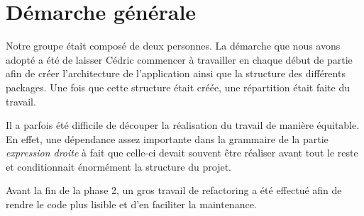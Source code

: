 \section{Démarche générale}


Notre groupe était composé de deux personnes. La démarche que nous avons adopté a été de laisser Cédric commencer à travailler en chaque début de partie afin de créer l'architecture de l'application ainsi que la structure des différents packages. Une fois que cette structure était créée, une répartition était faite du travail.
 
 
 Il a parfois été difficile de découper la réalisation du travail de manière équitable. En effet, une dépendance assez importante dans la grammaire de la partie \emph{expression droite} à fait que celle-ci devait souvent être réaliser avant tout le reste et conditionnait énormément la structure du projet.
 
 Avant la fin de la phase 2, un gros travail de refactoring a été effectué afin de rendre le code plus lisible et d'en faciliter la maintenance.